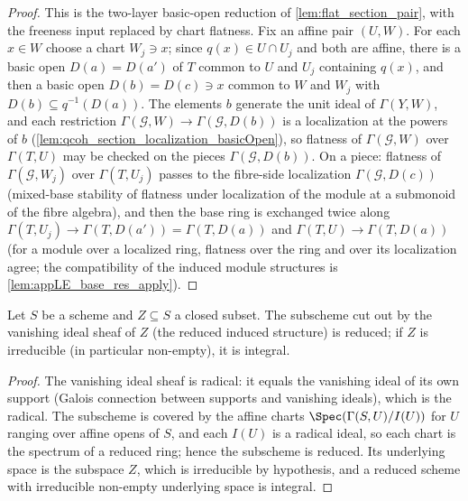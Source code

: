 \begin{proof}
  \leanok
  This is the two-layer basic-open reduction of
  \cref{lem:flat_section_pair}, with the freeness input replaced by chart
  flatness.  Fix an affine pair \((U, W)\).  For each \(x \in W\) choose a
  chart \(W_j \ni x\); since \(q(x) \in U \cap U_j\) and both are affine,
  there is a basic open \(D(a) = D(a')\) of \(T\) common to \(U\) and
  \(U_j\) containing \(q(x)\), and then a basic open
  \(D(b) = D(c) \ni x\) common to \(W\) and \(W_j\) with
  \(D(b) \subseteq q^{-1}(D(a))\).  The elements \(b\) generate the unit
  ideal of \(\Gamma(Y, W)\), and each restriction
  \(\Gamma(\mathcal G, W) \to \Gamma(\mathcal G, D(b))\) is a localization at the powers of
  \(b\) (\cref{lem:qcoh_section_localization_basicOpen}), so flatness of
  \(\Gamma(\mathcal G, W)\) over \(\Gamma(T, U)\) may be checked on the pieces
  \(\Gamma(\mathcal G, D(b))\).  On a piece: flatness of \(\Gamma(\mathcal G, W_j)\) over
  \(\Gamma(T, U_j)\) passes to the fibre-side localization
  \(\Gamma(\mathcal G, D(c))\) (mixed-base stability of flatness under localization
  of the module at a submonoid of the fibre algebra), and then the base ring
  is exchanged twice along
  \(\Gamma(T, U_j) \to \Gamma(T, D(a')) = \Gamma(T, D(a))\) and
  \(\Gamma(T, U) \to \Gamma(T, D(a))\) (for a module over a localized ring,
  flatness over the ring and over its localization agree; the compatibility
  of the induced module structures is \cref{lem:appLE_base_res_apply}).
\end{proof}

\begin{lemma}

\leanok
  \label{lem:vanishing_ideal_subscheme_integral}
  Let \(S\) be a scheme and \(Z \subseteq S\) a closed subset.  The
  subscheme cut out by the vanishing ideal sheaf of \(Z\) (the reduced
  induced structure) is reduced; if \(Z\) is irreducible (in particular
  non-empty), it is integral.
\end{lemma}

\begin{proof}
  \leanok
  The vanishing ideal sheaf is radical: it equals the vanishing ideal of
  its own support (Galois connection between supports and vanishing
  ideals), which is the radical.  The subscheme is covered by the affine
  charts \(\Spec(\Gamma(S, U)/I(U))\) for \(U\) ranging over affine opens
  of \(S\), and each \(I(U)\) is a radical ideal, so each chart is the
  spectrum of a reduced ring; hence the subscheme is reduced.  Its
  underlying space is the subspace \(Z\), which is irreducible by
  hypothesis, and a reduced scheme with irreducible non-empty underlying
  space is integral.
\end{proof}

